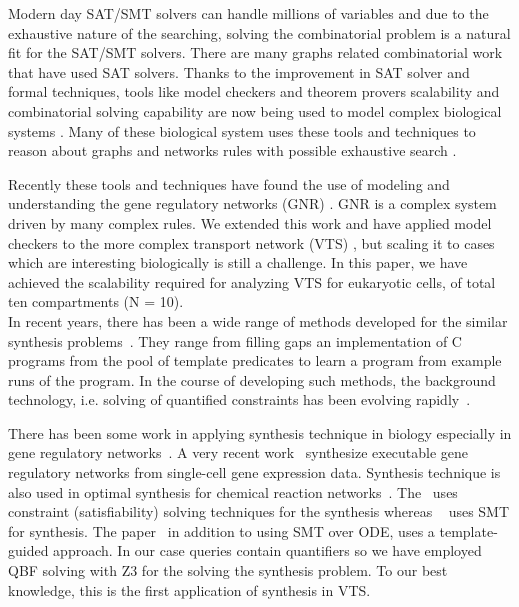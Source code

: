 Modern day SAT/SMT solvers can handle millions of variables and due to the exhaustive nature of the searching, solving the combinatorial problem is a natural fit for the SAT/SMT solvers. There are many graphs related combinatorial work \cite{gay2013solving,wotzlaw2012generalized} that have used SAT solvers. Thanks to the improvement in SAT solver and formal techniques, tools like model checkers and theorem provers scalability and combinatorial solving capability are now being used to model complex biological systems \cite{heule2010exact,yordanov2013smt,mangla2010timing}.
Many of these biological system uses these tools and techniques to reason about graphs and networks rules with possible exhaustive search \cite{guerra2012reasoning,chin2008biographe}.

Recently these tools and techniques have found the use of modeling and understanding the gene regulatory networks (GNR) \cite{giacobbe2015model,rosenblueth2014inference, batt2010efficient, yordanov2016method, dunn2014defining, paoletti2014analyzing, koksal2013synthesis}. GNR is a complex system driven by many complex rules. We extended this work and have applied model checkers to the more complex transport network (VTS) \cite{mani2016stacking,shukla}, but scaling it to cases which are interesting biologically is still a challenge. In this paper, we have achieved the scalability required for analyzing VTS for eukaryotic cells, of total ten compartments (N = 10). \\


In recent years, there has been a wide range of methods
developed for the similar synthesis problems~\cite{sketch,sygus,exampleSynth}.
%
They range from filling gaps an implementation of C programs from the pool of template predicates to learn a program from example
runs of the program.
%
In the course of developing such methods,
the background technology, i.e. solving of quantified
constraints has been evolving rapidly~\cite{lonsing2010depqbf,z3Quant}.
%

There has been some work in
applying synthesis technique in biology especially in gene regulatory networks~\cite{shavit2016automated, fisher2015synthesising}. A very recent work~\cite{fisher2015synthesising} synthesize executable gene regulatory networks from single-cell gene expression data.
Synthesis technique is also used in optimal synthesis for chemical reaction networks~\cite{cardelli2017syntax}. The~\cite{fisher2015synthesising} uses constraint (satisfiability) solving techniques for the synthesis whereas ~\cite{shavit2016automated} uses SMT for synthesis. The paper~\cite{cardelli2017syntax} in addition to using SMT over ODE, uses a template-guided approach. In our case queries contain quantifiers so we have employed QBF solving with Z3 for the solving the synthesis problem. To our best knowledge, this is the first application of synthesis in VTS.

~        
